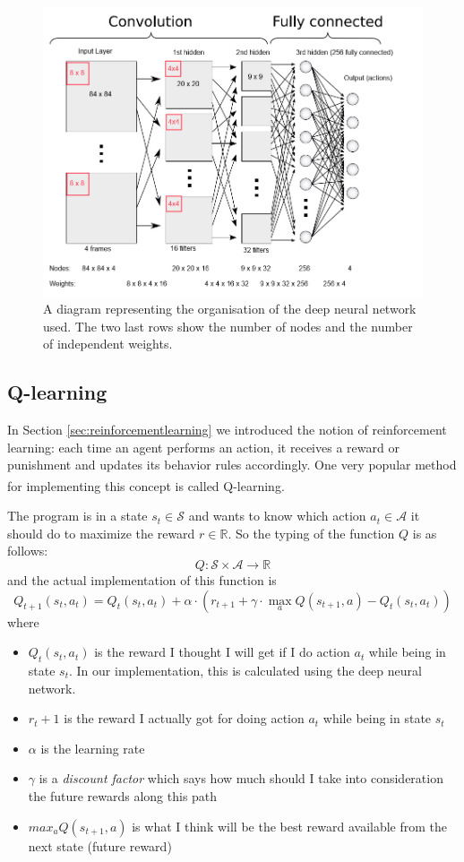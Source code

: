 \documentclass[a4paper,12pt]{article}
\begin{document}
\begin{figure}[H]
	\centering
	\includegraphics[width=\textwidth]{images/Convolutional_NN2.png}
	\caption{A diagram representing the organisation of the deep neural network used. The two last rows show the number of nodes and the number of independent weights.}
	\label{fig:neuralnet}
\end{figure}

\subsection{Q-learning}
In Section \ref{sec:reinforcementlearning} we introduced the notion of reinforcement learning: each time an agent performs an action, it receives a reward or punishment and updates its behavior rules accordingly. One very popular method for implementing this concept is called Q-learning\textsuperscript{\cite{watkins1992q}}.

The program is in a state $s_t \in \mathcal{S}$ and wants to know which action $a_t \in \mathcal{A}$ it should do to maximize the reward $r \in \mathds{R}$. So the typing of the function $Q$ is as follows:
$$Q: \mathcal{S} \times \mathcal{A} \rightarrow  \mathds{R}$$
and the actual implementation of this function is
$$Q_{t+1}(s_t, a_t) = Q_t(s_t, a_t) + \alpha\cdot(r_{t+1} + \gamma\cdot\max_{a}Q(s_{t+1}, a) - Q_t(s_t, a_t))$$
where
\begin{itemize}
	\itemsep 0em
	\item[] $Q_t(s_t, a_t)$ is the reward I thought I will get if I do action $a_t$ while being in state $s_t$. In our implementation, this is calculated using the deep neural network.
	\item[] $r_t+1$ is the reward I actually got for doing action $a_t$ while being in state $s_t$
	\item[] $\alpha$ is the learning rate
	\item[] $\gamma$ is a \emph{discount factor} which says how much should I take into consideration the future rewards along this path
	\item[] $max_{a}Q(s_{t+1}, a)$ is what I think will be the best reward available from the next state (future reward)
\end{itemize}
\end{document}
